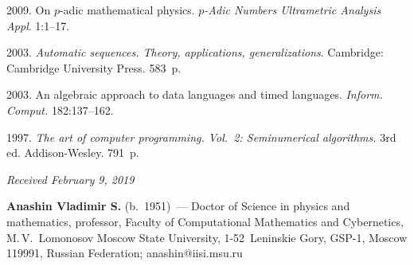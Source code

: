 \begin{multicols}{2}
{{\begin{thebibliography}{99}
 2009. 
On $p$-adic mathematical physics. 
\textit{$p$-Adic Numbers Ultrametric Analysis Appl}.
1:1--17. 
   
 2003. 
\textit{Automatic sequences. Theory, applications, generalizations}.
Cambridge: Cambridge University Press. 583~p.

 2003.
An algebraic approach to data languages and timed languages.
\textit{Inform.  Comput.} 182:137--162.


 1997.
\textit{The art of computer programming. Vol.~2: Seminumerical
algorithms.} 3rd ed. Addison-Wesley. 791~p.
\end{thebibliography}

 }
 }

\end{multicols}

\vspace*{-6pt}

\hfill{\small\textit{Received February 9, 2019}}







\Contrl

\noindent
\textbf{Anashin Vladimir S.} (b.\ 1951)~--- 
Doctor of Science in physics and mathematics,
professor, Faculty of Computational Mathematics and Cybernetics, M.\,V.~Lomonosov
Moscow State University,
1-52~Leninskie Gory, GSP-1,  Moscow 119991, Russian Federation;
 \mbox{anashin@iisi.msu.ru}
\label{end\stat}

\renewcommand{\bibname}{\protect\rm Литература}  